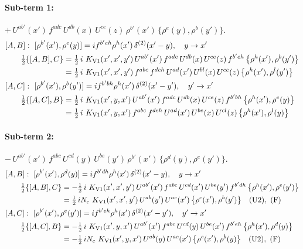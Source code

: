 \documentclass[10pt]{article}
\numberwithin{equation}{section}
\begin{document}
\paragraph{Sub-term 1:} $+\,U^{ab'}(x')\,f^{adc}\,U^{db}(x)\,U^{ce}(z)\,\rho^{b'}(x')\,\big\{\rho^{e}(y),\rho^{b}(y')\big\}$.
\begin{align}
&[A,B]:\ [\rho^{b'}(x'),\rho^{e}(y)]=i f^{b'eh}\rho^{h}(x')\,\delta^{(2)}(x'-y),\quad y\to x'\notag\\
&\qquad \tfrac12\{[A,B],C\}=\tfrac12\,i\,\,K_{\rm V1}(x',x',y')\,U^{ab'}(x')\,f^{adc}\,U^{db}(x)\,U^{ce}(z)\,f^{b'eh}\,\big\{\rho^{h}(x'),\rho^{b}(y')\big\}\notag\\
&\qquad\phantom{\tfrac12\{[A,B],C\}}=\tfrac12\,i\,\,K_{\rm V1}(x',x',y')\,f^{abc}\,f^{deh}\,U^{ad}(x')\,U^{bl}(x)\,U^{ce}(z)\,\big\{\rho^{h}(x'),\rho^{l}(y')\big\}
\label{eq:GI.V1-1-AB}\\
&[A,C]:\ [\rho^{b'}(x'),\rho^{b}(y')]=i f^{b'bh}\rho^{h}(x')\,\delta^{(2)}(x'-y'),\quad y'\to x'\notag\\
&\qquad \tfrac12\{[A,C],B\}=\tfrac12\,i\,\,K_{\rm V1}(x',y,x')\,U^{ab'}(x')\,f^{adc}\,U^{db}(x)\,U^{ce}(z)\,f^{b'bh}\,\big\{\rho^{h}(x'),\rho^{e}(y)\big\}\notag\\
&\qquad\phantom{\tfrac12\{[A,C],B\}}=\tfrac12\,i\,\,K_{\rm V1}(x',y,x')\,f^{abc}\,f^{deh}\,U^{ad}(x')\,U^{be}(x)\,U^{cl}(z)\,\big\{\rho^{h}(x'),\rho^{l}(y)\big\}
\label{eq:GI.V1-1-AC}
\end{align}
\paragraph{Sub-term 2:} $-\,U^{ab'}(x')\,f^{abc}\,U^{cd}(y)\,U^{be}(y')\,\rho^{b'}(x')\,\big\{\rho^{d}(y),\rho^{e}(y')\big\}$.
\begin{align}
&[A,B]:\ [\rho^{b'}(x'),\rho^{d}(y)]=i f^{b'dh}\rho^{h}(x')\,\delta^{(2)}(x'-y),\quad y\to x'\notag\\
&\qquad \tfrac12\{[A,B],C\}=-\tfrac12\,i\,\,K_{\rm V1}(x',x',y')\,U^{ab'}(x')\,f^{abc}\,U^{cd}(x')\,U^{be}(y')\,f^{b'dh}\,\big\{\rho^{h}(x'),\rho^{e}(y')\big\}\notag\\
&\qquad\phantom{\tfrac12\{[A,B],C\}}=\tfrac12\,i N_{c}\,\,K_{\rm V1}(x',x',y')\,U^{ab}(y')\,U^{ac}(x')\,\big\{\rho^{c}(x'),\rho^{b}(y')\big\}\quad\text{(U2)},\ \text{(F)}
\label{eq:GI.V1-2-AB}\\
&[A,C]:\ [\rho^{b'}(x'),\rho^{e}(y')]=i f^{b'eh}\rho^{h}(x')\,\delta^{(2)}(x'-y'),\quad y'\to x'\notag\\
&\qquad \tfrac12\{[A,C],B\}=-\tfrac12\,i\,\,K_{\rm V1}(x',y,x')\,U^{ab'}(x')\,f^{abc}\,U^{cd}(y)\,U^{be}(x')\,f^{b'eh}\,\big\{\rho^{h}(x'),\rho^{d}(y)\big\}\notag\\
&\qquad\phantom{\tfrac12\{[A,C],B\}}=-\tfrac12\,i N_{c}\,\,K_{\rm V1}(x',y,x')\,U^{ab}(y)\,U^{ac}(x')\,\big\{\rho^{c}(x'),\rho^{b}(y)\big\}\quad\text{(U2)},\ \text{(F)}
\label{eq:GI.V1-2-AC}
\end{align}
\end{document}
